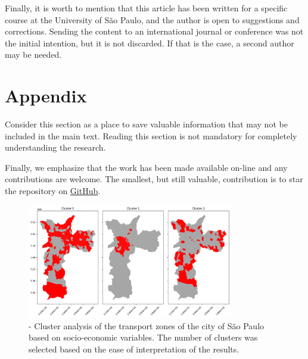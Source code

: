 \documentclass[12pt]{gsis} %
\begin{document}
Finally, it is worth to mention that this article has been written for a specific course at the University of São Paulo, and the author is open to suggestions and corrections.
Sending the content to an international journal or conference was not the initial intention, but it is not discarded.
If that is the case, a second author may be needed.




\section{Appendix}

Consider this section as a place to save valuable information that may not be included in the main text.
Reading this section is not mandatory for completely understanding the research.

Finally, we emphasize that the work has been made available on-line and any contributions are welcome.
The smallest, but still valuable, contribution is to star the repository on \href{https://github.com/Gui-FernandesBR/MetroImpactOnPropertyValues}{GitHub}.

\begin{figure}[ht]
	\centering
	\includegraphics[width=0.8\textwidth]{figs/cluster-3.png}
	\caption{- Cluster analysis of the transport zones of the city of São Paulo based on socio-economic variables. The number of clusters was selected based on the ease of interpretation of the results.}
	\label{fig:cluster}
\end{figure}
\end{document}
